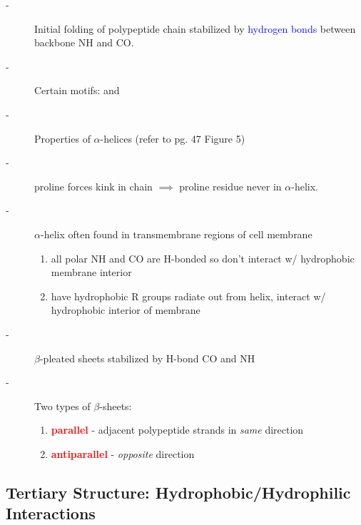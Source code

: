 \documentclass[../Bio_chemistryReview.tex]{subfiles}
\begin{document}
\begin{description}
  \item[-] Initial folding of polypeptide chain stabilized by \textcolor{blue}{hydrogen bonds} between backbone NH and CO.
  \item[-] Certain motifs:  and 
  \item[-] Properties of $\alpha$-helices (refer to pg. 47 Figure 5) \\
  \item[-] proline forces kink in chain $\implies$ proline residue never in
    $\alpha$-helix.  
  \item[-] $\alpha$-helix often found in transmembrane regions of cell membrane
    \begin{enumerate}
      \item all polar NH and CO are H-bonded so don't interact w/ hydrophobic
        membrane interior 
      \item have hydrophobic R groups radiate out from helix,
        interact w/ hydrophobic interior of membrane
    \end{enumerate}

  \item[-] $\beta$-pleated sheets stabilized by H-bond CO and NH
  \item[-] Two types of $\beta$-sheets:
    \begin{enumerate}
      \item \textcolor{red}{\textbf{parallel}} - adjacent polypeptide strands in
        \textit{same} direction 
      \item \textcolor{red}{\textbf{antiparallel}} -
        \textit{opposite} direction
    \end{enumerate}	
\end{description}

\subsection{Tertiary Structure: Hydrophobic/Hydrophilic Interactions}
\end{document}
